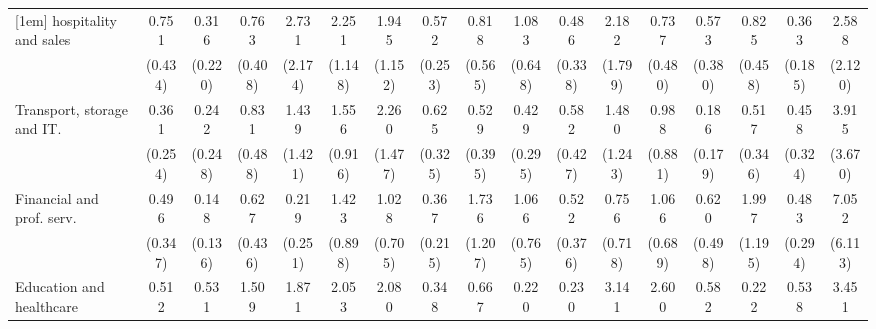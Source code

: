 {\begin{tabular}{l*{16}{c}}
[1em]
hospitality and sales&       0.751         &       0.316         &       0.763         &       2.731         &       2.251         &       1.945         &       0.572         &       0.818         &       1.083         &       0.486         &       2.182         &       0.737         &       0.573         &       0.825         &       0.363\sym{*}  &       2.588         \\
                    &     (0.434)         &     (0.220)         &     (0.408)         &     (2.174)         &     (1.148)         &     (1.152)         &     (0.253)         &     (0.565)         &     (0.648)         &     (0.338)         &     (1.799)         &     (0.480)         &     (0.380)         &     (0.458)         &     (0.185)         &     (2.120)         \\
[1em]
Transport, storage and IT.&       0.361         &       0.242         &       0.831         &       1.439         &       1.556         &       2.260         &       0.625         &       0.529         &       0.429         &       0.582         &       1.480         &       0.988         &       0.186         &       0.517         &       0.458         &       3.915         \\
                    &     (0.254)         &     (0.248)         &     (0.488)         &     (1.421)         &     (0.916)         &     (1.477)         &     (0.325)         &     (0.395)         &     (0.295)         &     (0.427)         &     (1.243)         &     (0.881)         &     (0.179)         &     (0.346)         &     (0.324)         &     (3.670)         \\
[1em]
Financial and prof. serv.&       0.496         &       0.148\sym{*}  &       0.627         &       0.219         &       1.423         &       1.028         &       0.367         &       1.736         &       1.066         &       0.522         &       0.756         &       1.066         &       0.620         &       1.997         &       0.483         &       7.052\sym{*}  \\
                    &     (0.347)         &     (0.136)         &     (0.436)         &     (0.251)         &     (0.898)         &     (0.705)         &     (0.215)         &     (1.207)         &     (0.765)         &     (0.376)         &     (0.718)         &     (0.689)         &     (0.498)         &     (1.195)         &     (0.294)         &     (6.113)         \\
[1em]
Education and healthcare&       0.512         &       0.531         &       1.509         &       1.871         &       2.053         &       2.080         &       0.348         &       0.667         &       0.220         &       0.230         &       3.141         &       2.600         &       0.582         &       0.222         &       0.538         &       3.451         \\

\end{tabular}}
